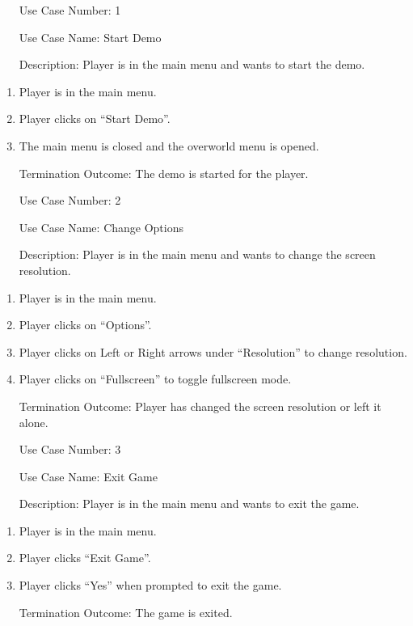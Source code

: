 \documentclass[10pt,conference,onecolumn,compsoc]{IEEEtran}
\begin{document}
\begin{itemize}
\item[Use Case Number:] 1
\item[Use Case Name:] Start Demo
\item[Description:] Player is in the main menu and wants to start the demo.
\end{itemize}
\begin{enumerate}
\item Player is in the main menu.
\item Player clicks on “Start Demo”.
\item The main menu is closed and the overworld menu is opened.
\item[Termination Outcome:] The demo is started for the player.
\end{enumerate}

\begin{itemize}
\item[Use Case Number:] 2
\item[Use Case Name:] Change Options
\item[Description:] Player is in the main menu and wants to change the screen resolution.
\end{itemize}
\begin{enumerate}
\item Player is in the main menu.
\item Player clicks on “Options”.
\item Player clicks on Left or Right arrows under “Resolution” to change resolution.
\item Player clicks on “Fullscreen” to toggle fullscreen mode.
\item [Termination Outcome:] Player has changed the screen resolution or left it alone.
\end{enumerate}

\begin{itemize}
\item[Use Case Number:] 3
\item[Use Case Name:] Exit Game
\item[Description:] Player is in the main menu and wants to exit the game.
\end{itemize}
\begin{enumerate}
\item Player is in the main menu.
\item Player clicks “Exit Game”.
\item Player clicks “Yes” when prompted to exit the game.
\item [Termination Outcome:] The game is exited.
\end{enumerate}
\end{document}
